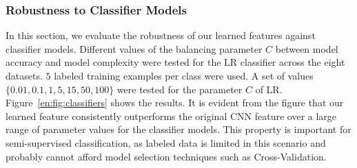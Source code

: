 


\subsubsection{Robustness to Classifier Models}
In this section, we evaluate the robustness of our learned features
against classifier models. Different values of the balancing parameter
$C$ between model accuracy and model complexity were tested for the LR
classifier across the eight datasets.  $5$ labeled training examples
per class were used.  A set of values $\{0.01, 0.1, 1, 5, 15, 50,
100\}$ were tested for the parameter $C$ of LR. Figure~\ref{en:fig:classifiers}
shows the results. It is evident from the figure that our learned
feature consistently outperforms the original CNN feature over a large
range of parameter values for the classifier models. This property is
important for semi-supervised classification, as labeled data is
limited in this scenario and probably cannot afford model selection
techniques such as Cross-Validation.


